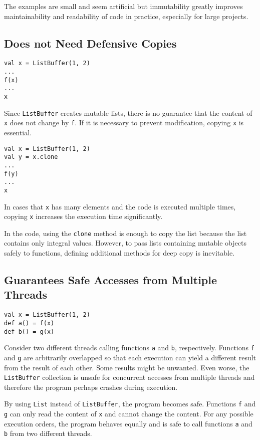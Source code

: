 The examples are small and seem artificial but immutability greatly improves
maintainability and readability of code in practice, especially for large
projects.

\subsection{Does not Need Defensive Copies}

\begin{verbatim}
val x = ListBuffer(1, 2)
...
f(x)
...
x
\end{verbatim}

Since \verb!ListBuffer! creates mutable lists, there is no guarantee that the
content of \verb!x! does not change by \verb!f!. If it is necessary to prevent
modification, copying \verb!x! is essential.

\begin{verbatim}
val x = ListBuffer(1, 2)
val y = x.clone
...
f(y)
...
x
\end{verbatim}

In cases that \verb!x! has many elements and the code is executed multiple times,
copying \verb!x! increases the execution time significantly.

In the code, using the \verb!clone! method is enough to copy the list because the
list contains only integral values. However, to pass lists containing mutable
objects safely to functions, defining additional methods for deep copy is
inevitable.

\subsection{Guarantees Safe Accesses from Multiple Threads}

\begin{verbatim}
val x = ListBuffer(1, 2)
def a() = f(x)
def b() = g(x)
\end{verbatim}

Consider two different threads calling functions \verb!a! and \verb!b!,
respectively. Functions \verb!f! and \verb!g! are arbitrarily overlapped so that
each execution can yield a different result from the result of each other. Some
results might be unwanted. Even worse, the \verb!ListBuffer! collection is unsafe
for concurrent accesses from multiple threads and therefore the program perhaps
crashes during execution.

By using \verb!List! instead of \verb!ListBuffer!, the program becomes safe.
Functions \verb!f! and \verb!g! can only read the content of \verb!x! and cannot
change the content. For any possible execution orders, the program behaves
equally and is safe to call functions \verb!a! and \verb!b! from two different
threads.

